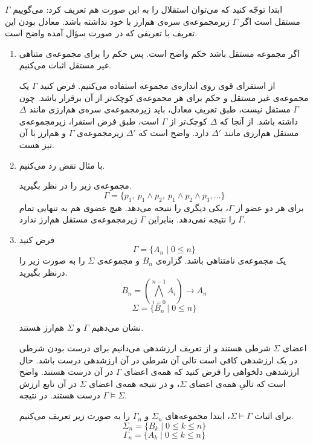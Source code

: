 \begin{ans}
  ابتدا توجّه کنید که می‌توان استقلال را به این صورت هم تعریف کرد: می‌گوییم $\Gamma$ مستقل است اگر $\Gamma$ زیرمجموعه‌ی سره‌ی هم‌ارز با خود نداشته باشد. معادل بودن این تعریف با تعریفی که در صورت سؤال آمده واضح است.
  \begin{enumerate}
    \item
    اگر مجموعه مستقل باشد حکم واضح است. پس حکم را برای مجموعه‌ی متناهی غیر مستقل اثبات می‌کنیم.

    از استقرای قوی روی اندازه‌ی مجموعه استفاده می‌کنیم. فرض کنید $\Gamma$ یک مجموعه‌ی غیر مستقل و حکم برای هر مجموعه‌ی کوچک‌تر از آن برقرار باشد.
    چون $\Gamma$ مستقل نیست، طبق تعریفِ معادل، باید زیرمجموعه‌ی سره‌ی هم‌ارزی مانند $\Delta$ داشته باشد. از آنجا که $\Delta$ کوچک‌تر از $\Gamma$ است، طبق فرض استقرا، زیرمجموعه‌ی مستقل هم‌ارزی مانند $\Delta'$ دارد. واضح است که $\Delta'$ زیرمجموعه‌ی $\Gamma$ و هم‌ارز با آن نیز هست.

    \item
    با مثال نقض رد می‌کنیم.

    مجموعه‌ی زیر را در نظر بگیرید.
    $$ \Gamma = \{p_1,~ p_1 \wedge p_2,~ p_1 \wedge p_2 \wedge p_3, \dots \} $$
    برای هر دو عضو از $\Gamma$، یکی دیگری را نتیجه می‌دهد. هیچ عضوی هم به تنهایی تمام $\Gamma$ را نتیجه نمی‌دهد. بنابراین $\Gamma$ زیرمجموعه‌ی مستقل هم‌ارز ندارد.

    \item
    فرض کنید
    $$ \Gamma = \{ A_n \mid 0 \leq n \} $$
    یک مجموعه‌ی نامتناهی باشد.
    گزاره‌ی $B_n$ و مجموعه‌ی $\Sigma$ را به صورت زیر را درنظر بگیرید.
    $$ B_n = (\bigwedge_{i=0}^{n-1} A_i) \rightarrow A_n $$
    $$ \Sigma = \{ B_n \mid 0 \leq n \} $$

    نشان می‌دهیم $\Gamma$ و $\Sigma$ هم‌ارز هستند.

    اعضای $\Sigma$ شرطی هستند و از تعریف ارزشدهی می‌دانیم برای درست بودن شرطی در یک ارزشدهی کافی است تالی آن شرطی در آن ارزشدهی درست باشد. حال ارزشدهی دلخواهی را فرض کنید که همه‌ی اعضای $\Gamma$ در آن درست هستند. واضح است که تالیِ همه‌ی اعضای $\Sigma$، و در نتیجه همه‌ی اعضای $\Sigma$ در آن تابع ارزش درست هستند. در نتیجه $\Gamma \models \Sigma$.

    برای اثبات $\Sigma \models \Gamma$، ابتدا
    مجموعه‌های $\Sigma_n$ و $\Gamma_n$ را به صورت زیر تعریف می‌کنیم.
    $$ \Sigma_n = \{ B_k \mid 0 \leq k \leq n \} $$
    $$ \Gamma_n = \{ A_k \mid 0 \leq k \leq n \} $$


\end{enumerate}
\end{ans}
